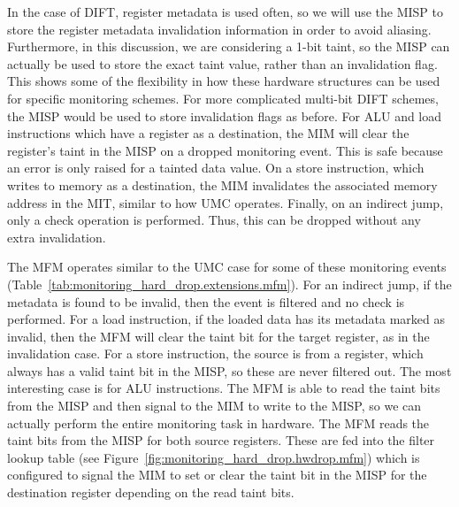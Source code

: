 In the case of DIFT, register metadata is used often, so we will use the MISP
to store the register metadata invalidation information in order to avoid aliasing.  Furthermore,
in this discussion, we are considering a 1-bit taint, so the MISP can actually
be used to store the exact
taint value, rather than an invalidation flag. This shows some of the
flexibility in how these hardware structures can be used for specific
monitoring schemes. For more complicated multi-bit DIFT schemes, the MISP would
be used to store invalidation flags as before.  For ALU and load instructions
which have a register as a destination, the MIM will clear the register's taint
in the MISP on a dropped monitoring event. This is safe because an error is
only raised for a tainted data value. On a store instruction, which writes to
memory as a destination, the MIM invalidates the associated memory address in
the MIT, similar to how UMC operates. Finally, on an indirect jump, only a
check operation is performed. Thus, this can be dropped without any extra
invalidation. 

The MFM operates similar to the UMC case for some of these monitoring events
(Table~\ref{tab:monitoring_hard_drop.extensions.mfm}).  For an indirect jump,
if the metadata is found to be invalid, then the event is filtered and no check
is performed. For a load instruction, if the loaded data has its metadata
marked as invalid, then the MFM will clear the taint bit for the target
register, as in the invalidation case. For a store instruction, the source is
from a register, which always has a valid taint bit in the MISP, so these are
never filtered out. The most interesting case is for ALU instructions. The MFM
is able to read the taint bits from the MISP and then signal to the MIM to
write to the MISP, so we can actually perform the entire monitoring task in
hardware. The MFM reads the taint bits from the MISP for both source registers.
These are fed into the filter lookup table (see
Figure~\ref{fig:monitoring_hard_drop.hwdrop.mfm}) which is configured to signal
the MIM to set or clear the taint bit in the MISP for the destination register
depending on the read taint bits.

